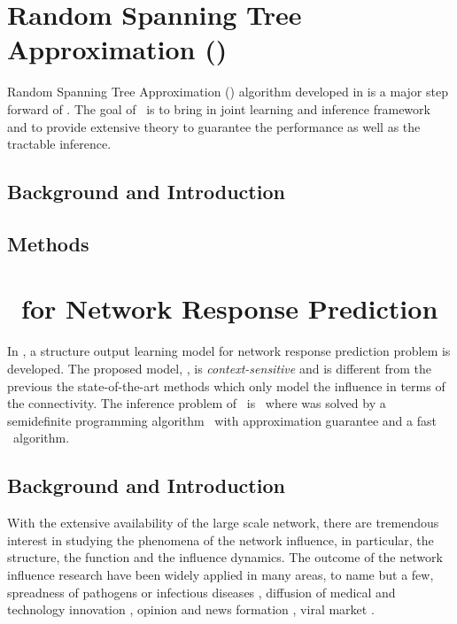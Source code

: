 {%
%
\section{Random Spanning Tree Approximation (\rta)}

Random Spanning Tree Approximation (\rta) algorithm developed in  is a major step forward of \mam.
The goal of \rta\ is to bring in joint learning and inference framework and to provide extensive theory to guarantee the performance as well as the tractable inference.

\subsection{Background and Introduction}

\subsection{Methods}



%
%
\section{\spin\ for Network Response Prediction}

In , a structure output learning model for network response prediction problem is developed.
The proposed model, \spin, is \textit{context-sensitive} and is different from the previous the state-of-the-art methods which only model the influence in terms of the connectivity.
The inference problem of \spin\ is \nphard\ where was solved by a semidefinite programming algorithm \sdp\ with approximation guarantee and a fast \greedy\ algorithm.

\subsection{Background and Introduction}

With the extensive availability of the large scale network, there are tremendous interest in studying the phenomena of the network influence, in particular, the structure, the function and the influence dynamics. 
The outcome of the network influence research have been widely applied in many areas, to name but a few, spreadness of pathogens or infectious diseases \citep{Hethcote00the,Anderson02infectious}, diffusion of medical and technology innovation \citep{Strang98diffusion,Rogers03the}, opinion and news formation \citep{Adar04implicit,Gruhl04information,Adar05tracking,Leskovec07cascading,Nowell08tracing,Leskovec09meme}, viral market \citep{Domingos01mining,Kempe03maximizing,Liben-Nowell03the}.

}
